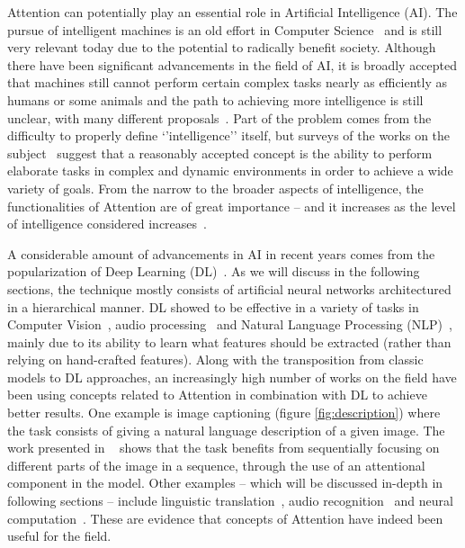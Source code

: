 \documentclass[English]{style/ic-tese-v3}
\begin{document}
Attention can potentially play an essential role in Artificial Intelligence (AI).
The pursue of intelligent machines is an old effort in Computer Science~\cite{ref:turing} and is still very
relevant today due to the potential to radically benefit society.
Although there have been significant advancements in the field of AI, it is broadly accepted that
machines still cannot perform certain complex tasks nearly as efficiently as humans or some animals and
the path to achieving more intelligence is still unclear, with many different proposals~\cite{ref:mikolov}.
Part of the problem comes from the difficulty to properly define `'intelligence'' itself, but
surveys of the works on the subject~\cite{ref:aidef} suggest that a reasonably accepted
concept is the ability to perform elaborate tasks in complex and dynamic environments
in order to achieve a wide variety of goals.
From the narrow to the broader aspects of intelligence, the functionalities of Attention
are of great importance -- and it increases
as the level of intelligence considered increases~\cite{ref:helgason}.

A considerable amount of advancements in AI in recent years comes from
the popularization of Deep Learning (DL)~\cite{ref:dl}.
As we will discuss in the following sections, the technique mostly consists of
artificial neural networks architectured in a hierarchical manner.
DL showed to be effective in a variety of tasks in Computer Vision~\cite{ref:imagenet}\cite{ref:segmentation},
audio processing~\cite{ref:wavenet} and Natural Language
Processing (NLP)~\cite{ref:att-all-you-need}, mainly due to its ability
to learn what features should be extracted (rather than relying on hand-crafted features).
Along with the transposition from classic models to DL
approaches, an increasingly high number of works on the field
have been using concepts related to Attention in combination with DL to achieve better results.
One example is image captioning (figure \ref{fig:description}) where the task
consists of giving a natural language description of a given image.
The work presented in ~\cite{ref:img-captioning} shows that the task benefits from
sequentially focusing on different parts of the image in a sequence,
through the use of an attentional component in the model.
Other examples -- which will be discussed in-depth in following sections -- include linguistic
translation~\cite{ref:translation}, audio recognition~\cite{ref:audio} and neural computation~\cite{ref:ntm}.
These are evidence that concepts of Attention have indeed been useful for the field.
\end{document}

